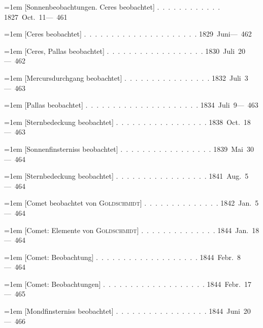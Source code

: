 \noindent\hangindent=1em [Sonnenbeobachtungen. Ceres beobachtet] \mbox{.\ .\ .\ .\ .\ .\ .\ .\ .\ .\ .\ .} \hfill\mbox{1827 Oct. 11}\quad\mbox{--- 461}\par\smallskip
\noindent\hangindent=1em [Ceres beobachtet] \mbox{.\ .\ .\ .\ .\ .\ .\ .\ .\ .\ .\ .\ .\ .\ .\ .\ .\ .\ .\ .\ .} \hfill\mbox{1829 Juni}\quad\mbox{--- 462}\par\smallskip
\noindent\hangindent=1em [Ceres, Pallas beobachtet] \mbox{.\ .\ .\ .\ .\ .\ .\ .\ .\ .\ .\ .\ .\ .\ .\ .\ .\ .} \hfill\mbox{1830 Juli 20}\quad\mbox{--- 462}\par\smallskip
\noindent\hangindent=1em [Mercursdurchgang beobachtet] \mbox{.\ .\ .\ .\ .\ .\ .\ .\ .\ .\ .\ .\ .\ .\ .\ .} \hfill\mbox{1832 Juli 3}\quad\mbox{--- 463}\par\smallskip
\noindent\hangindent=1em [Pallas beobachtet] \mbox{.\ .\ .\ .\ .\ .\ .\ .\ .\ .\ .\ .\ .\ .\ .\ .\ .\ .\ .\ .\ .} \hfill\mbox{1834 Juli 9}\quad\mbox{--- 463}\par\smallskip
\noindent\hangindent=1em [Sternbedeckung beobachtet] \mbox{.\ .\ .\ .\ .\ .\ .\ .\ .\ .\ .\ .\ .\ .\ .\ .\ .} \hfill\mbox{1838 Oct. 18}\quad\mbox{--- 463}\par\smallskip
\noindent\hangindent=1em [Sonnenfinsterniss beobachtet] \mbox{.\ .\ .\ .\ .\ .\ .\ .\ .\ .\ .\ .\ .\ .\ .\ .\ .} \hfill\mbox{1839 Mai 30}\quad\mbox{--- 464}\par\smallskip
\noindent\hangindent=1em [Sternbedeckung beobachtet] \mbox{.\ .\ .\ .\ .\ .\ .\ .\ .\ .\ .\ .\ .\ .\ .\ .\ .} \hfill\mbox{1841 Aug. 5}\quad\mbox{--- 464}\par\smallskip
\noindent\hangindent=1em [Comet beobachtet von \textsc{Goldschmidt}] \mbox{.\ .\ .\ .\ .\ .\ .\ .\ .\ .\ .\ .\ .\ .} \hfill\mbox{1842 Jan. 5}\quad\mbox{--- 464}\par\smallskip
\noindent\hangindent=1em [Comet: Elemente von \textsc{Goldschmidt}] \mbox{.\ .\ .\ .\ .\ .\ .\ .\ .\ .\ .\ .\ .\ .} \hfill\mbox{1844 Jan. 18}\quad\mbox{--- 464}\par\smallskip
\noindent\hangindent=1em [Comet: Beobachtung] \mbox{.\ .\ .\ .\ .\ .\ .\ .\ .\ .\ .\ .\ .\ .\ .\ .\ .\ .\ .} \hfill\mbox{1844 Febr. 8}\quad\mbox{--- 464}\par\smallskip
\noindent\hangindent=1em [Comet: Beobachtungen] \mbox{.\ .\ .\ .\ .\ .\ .\ .\ .\ .\ .\ .\ .\ .\ .\ .\ .\ .\ .} \hfill\mbox{1844 Febr. 17}\quad\mbox{--- 465}\par\smallskip
\noindent\hangindent=1em [Mondfinsterniss beobachtet] \mbox{.\ .\ .\ .\ .\ .\ .\ .\ .\ .\ .\ .\ .\ .\ .\ .\ .} \hfill\mbox{1844 Juni 20}\quad\mbox{--- 466}\par\smallskip
